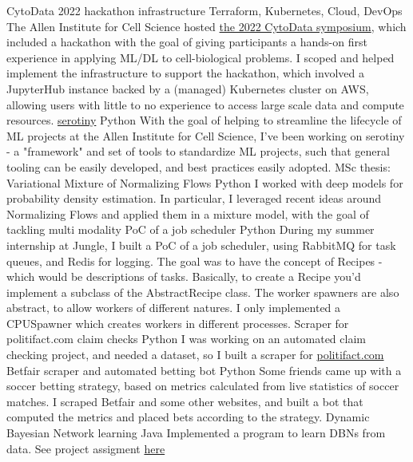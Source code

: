 \documentclass[]{colobas-cv}
\begin{document}
\entry
  {}
  {CytoData 2022 hackathon infrastructure}
  {Terraform, Kubernetes, Cloud, DevOps}
  {The Allen Institute for Cell Science hosted
    \href{https://www.cytodata.org/symposia/2022/}{the 2022 CytoData symposium},
    which included a hackathon with the goal of giving participants a hands-on
    first experience in applying ML/DL to cell-biological problems.
    I scoped and helped implement the infrastructure to support the hackathon,
    which involved a JupyterHub instance backed by a (managed) Kubernetes cluster
    on AWS, allowing users with little to no experience to access large scale
    data and compute resources.}
\entry
  {}
  {\href{https://allencell.org/serotiny}{serotiny}}
  {Python}
  {With the goal of helping to streamline the lifecycle of ML projects at
   the Allen Institute for Cell Science, I've been working on serotiny - a
   "framework" and set of tools to standardize ML projects, such that general
   tooling can be easily developed, and best practices easily adopted.}
\entry
  {}
  {MSc thesis: Variational Mixture of Normalizing Flows}
  {Python}
  {I worked with deep models for probability density estimation. In particular,
   I leveraged recent ideas around Normalizing Flows and applied them
   in a mixture model, with the goal of tackling multi modality}
\entry
  {}
  {PoC of a job scheduler}
  {Python}
  {During my summer internship at Jungle, I built a PoC of a job scheduler,
  using RabbitMQ for task queues, and Redis for logging. The goal was to have
  the concept of Recipes - which would be descriptions of tasks. Basically,
  to create a Recipe you'd implement a subclass of the AbstractRecipe class.
  The worker spawners are also abstract, to allow workers of different natures.
  I only implemented a CPUSpawner which creates workers in different processes.}
\entry
  {}
  {Scraper for politifact.com claim checks}
  {Python}
  {I was working on an automated claim checking project, and needed a dataset,
  so I built a scraper for \href{politifact.com}{politifact.com}}
\entry
  {}
  {Betfair scraper and automated betting bot}
  {Python}
  {Some friends came up with a soccer betting strategy, based on metrics 
  calculated from live statistics of soccer matches. I scraped Betfair and some
  other websites, and built a bot that computed the metrics and placed bets
  according to the strategy.}
\entry
  {}
  {Dynamic Bayesian Network learning}
  {Java}
  {Implemented a program to learn DBNs from data. See project assigment 
  \href{https://fenix.tecnico.ulisboa.pt/downloadFile/1689468335554723/apresentacao-projecto-POO1415.pdf}{here}}
\end{document}
